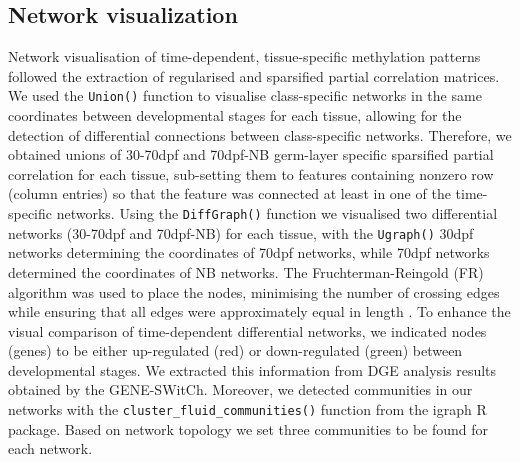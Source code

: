 \documentclass[
	a4paper, %
	10pt, %
	unnumberedsections, %
	twoside, %
]{LTJournalArticle}
\begin{document}
\subsection{\normalsize Network visualization}
Network visualisation of time-dependent, tissue-specific methylation patterns 
followed the extraction of regularised and sparsified partial correlation matrices. 
We used the \texttt{Union()} function to visualise class-specific networks in the same 
coordinates between 
developmental stages for each tissue, allowing for the detection of differential 
connections between class-specific networks. Therefore, 
we obtained unions of 30-70dpf and 70dpf-NB germ-layer specific sparsified 
partial correlation 
for each tissue, sub-setting them to features containing 
nonzero row (column entries) so that the feature was connected at least in one 
of the time-specific networks. Using the \texttt{DiffGraph()} function we visualised 
two differential 
networks (30-70dpf and 70dpf-NB) for each tissue, with the \texttt{Ugraph()} 30dpf networks 
determining the coordinates of 70dpf networks, while 70dpf networks determined the 
coordinates of NB networks. The Fruchterman-Reingold (FR) algorithm
was used to place the nodes, minimising the number of crossing edges while ensuring 
that all 
edges were approximately equal in length \autocite{fruchterman1991a}. To enhance the 
visual comparison of time-dependent 
differential networks, we indicated nodes (genes) to be either up-regulated (red) or 
down-regulated (green) between developmental stages. We extracted this information
from DGE analysis results obtained by the GENE-SWitCh. Moreover, we detected communities in our 
networks with the \texttt{cluster\_fluid\_communities()} function from the igraph R 
package. Based on network topology we set three communities to be found for each network.
\end{document}
